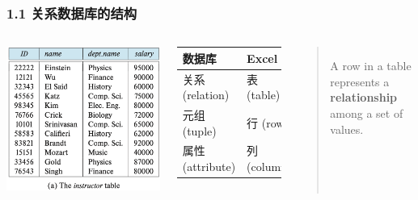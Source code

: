 \documentclass[aspectratio=169, 14pt]{beamer}
\begin{document}
\begin{frame}
    \frametitle{1.1 关系数据库的结构}

    \begin{columns}
        \includegraphics[width=\textwidth]{table/instructor}
        \begin{table}
            \begin{tabular}{ll}
              \toprule
              数据库 & Excel \\
              \midrule
              \alert{关系} (relation) & 表 (table) \\
              \alert{元组} (tuple) & 行 (row) \\
              \alert{属性} (attribute) & 列 (column) \\
              \bottomrule
            \end{tabular}
        \end{table}
        \begin{quote}
            A row in a table represents a \textbf{relationship} among a set of values. 
        \end{quote}
    \end{columns}
\end{frame}
\end{document}
